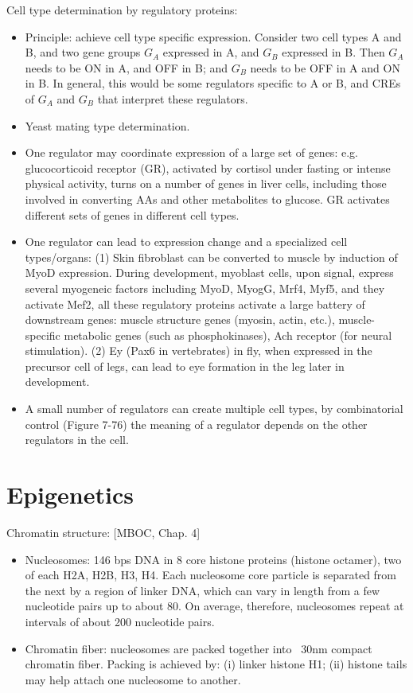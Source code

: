 \documentclass{report}
\begin{document}
Cell type determination by regulatory proteins: 
\begin{itemize}
	\item Principle: achieve cell type specific expression. Consider two cell types A and B, and two gene groups $G_A$ expressed in A, and $G_B$ expressed in B. Then $G_A$ needs to be ON in A, and OFF in B; and $G_B$ needs to be OFF in A and ON in B. In general, this would be some regulators specific to A or B, and CREs of $G_A$ and $G_B$ that interpret these regulators. 
	\item Yeast mating type determination. 
	\item One regulator may coordinate expression of a large set of genes: e.g. glucocorticoid receptor (GR), activated by cortisol under fasting or intense physical activity, turns on a number of genes in liver cells, including those involved in converting AAs and other metabolites to glucose. GR activates different sets of genes in different cell types. 
	\item One regulator can lead to expression change and a specialized cell types/organs: (1) Skin fibroblast can be converted to muscle by induction of MyoD expression. During development, myoblast cells, upon signal, express several myogeneic factors including MyoD, MyogG, Mrf4, Myf5, and they activate Mef2, all these regulatory proteins activate a large battery of downstream genes: muscle structure genes (myosin, actin, etc.), muscle-specific metabolic genes (such as phosphokinases), Ach receptor (for neural stimulation). (2) Ey (Pax6 in vertebrates) in fly, when expressed in the precursor cell of legs, can lead to eye formation in the leg later in development. 
	\item A small number of regulators can create multiple cell types, by combinatorial control (Figure 7-76) the meaning of a regulator depends on the other regulators in the cell. 
\end{itemize}









\section{Epigenetics}

Chromatin structure: [MBOC, Chap. 4]
\begin{itemize}
\item Nucleosomes: 146 bps DNA in 8 core histone proteins (histone octamer), two of each H2A, H2B, H3, H4. Each nucleosome core particle is separated from the next by a region of linker DNA, which can vary in length from a few nucleotide pairs up to about 80. On average, therefore, nucleosomes repeat at intervals of about 200 nucleotide pairs. 
\item Chromatin fiber: nucleosomes are packed together into ~30nm compact chromatin fiber. Packing is achieved by: (i) linker histone H1; (ii) histone tails may help attach one nucleosome to another. 
\end{itemize}
\end{document}
